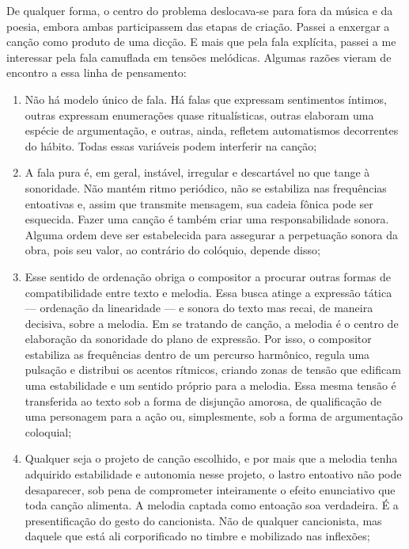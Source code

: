 De qualquer forma, o centro do problema deslocava-se para fora da música e
da poesia, embora ambas participassem das etapas de criação. Passei a
enxergar a canção como produto de uma dicção. E mais que pela fala
explícita, passei a me interessar pela fala camuflada em tensões
melódicas. Algumas razões vieram de encontro a essa linha de pensamento:

\begin{enumerate}%
\item Não há modelo único de fala. Há falas que expressam sentimentos
íntimos, outras expressam enumerações quase ritualísticas, outras
elaboram uma espécie de argumentação, e outras, ainda, refletem
automatismos decorrentes do hábito. Todas essas variáveis podem
interferir na canção;

\item A fala pura é, em geral, instável, irregular e descartável no que
tange à sonoridade. Não mantém ritmo periódico, não se estabiliza nas
frequências entoativas e, assim que transmite mensagem, sua cadeia
fônica pode ser esquecida. Fazer uma canção é também criar uma
responsabilidade sonora. Alguma ordem deve ser estabelecida para
assegurar a perpetuação sonora da obra, pois seu valor, ao contrário do
colóquio, depende disso;

\item Esse sentido de ordenação obriga o compositor a procurar outras
formas de compatibilidade entre texto e melodia. Essa busca atinge a
expressão tática --- ordenação da linearidade --- e sonora do texto mas
recai, de maneira decisiva, sobre a melodia. Em se tratando de canção, a
melodia é o centro de elaboração da sonoridade do plano de expressão.
Por isso, o compositor estabiliza as frequências dentro de um percurso
harmônico, regula uma pulsação e distribui os acentos rítmicos, criando
zonas de tensão que edificam uma estabilidade e um sentido próprio para
a melodia. Essa mesma tensão é transferida ao texto sob a forma de
disjunção amorosa, de qualificação de uma personagem para a ação ou,
simplesmente, sob a forma de argumentação coloquial;

\item Qualquer seja o projeto de canção escolhido, e por mais que a melodia
tenha adquirido estabilidade e autonomia nesse projeto, o lastro
entoativo não pode desaparecer, sob pena de comprometer inteiramente o
efeito enunciativo que toda canção alimenta. A melodia captada como
entoação soa verdadeira. É a presentificação do gesto do cancionista.
Não de qualquer cancionista, mas daquele que está ali corporificado no
timbre e mobilizado nas inflexões;


\end{enumerate}
